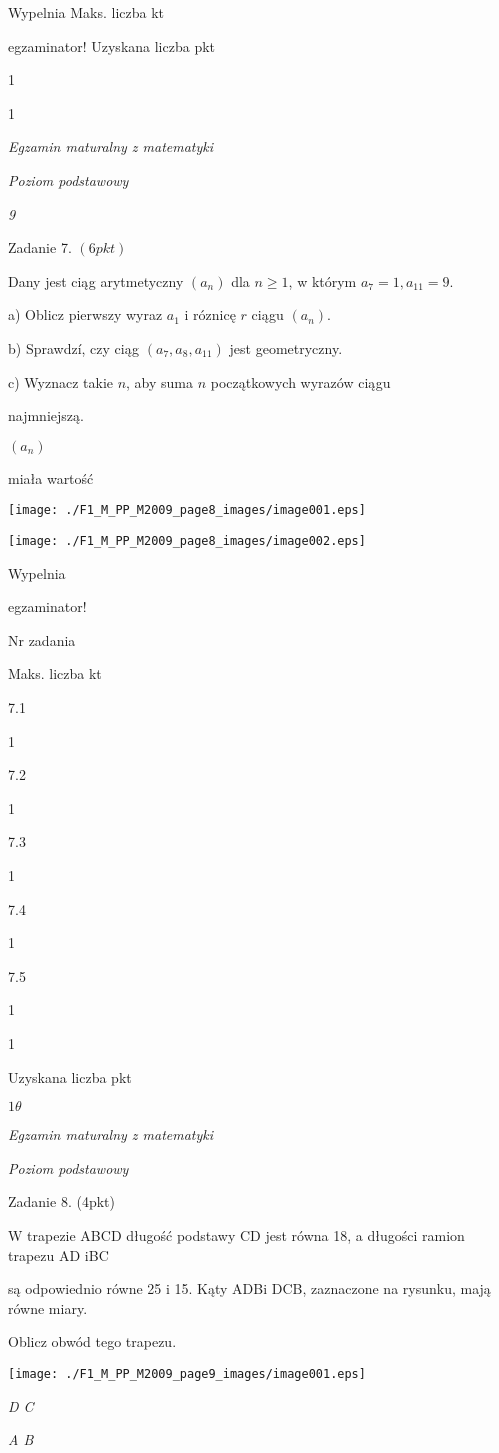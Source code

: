 \documentclass[a4paper,12pt]{article}
\begin{document}
Wypelnia Maks. liczba kt

egzaminator! Uzyskana liczba pkt

1

1





{\it Egzamin maturalny z matematyki}

{\it Poziom podstawowy}

{\it 9}

Zadanie 7. $(6pkt)$

Dany jest ciąg arytmetyczny $(a_{n})$ dla $n\geq 1$, w którym $a_{7}=1, a_{11}=9.$

a) Oblicz pierwszy wyraz $a_{1}$ i róznicę $r$ ciągu $(a_{n}).$

b) Sprawdzí, czy ciąg $(a_{7},a_{8},a_{11})$ jest geometryczny.

c) Wyznacz takie $n$, aby suma $n$ początkowych wyrazów ciągu

najmniejszą.

$(a_{n})$

miała wartość
\begin{center}
\texttt{[image: ./F1\_M\_PP\_M2009\_page8\_images/image001.eps]}

\texttt{[image: ./F1\_M\_PP\_M2009\_page8\_images/image002.eps]}
\end{center}
Wypelnia

egzaminator!

Nr zadania

Maks. liczba kt

7.1

1

7.2

1

7.3

1

7.4

1

7.5

1

1

Uzyskana liczba pkt





$ 1\theta$

{\it Egzamin maturalny z matematyki}

{\it Poziom podstawowy}

Zadanie 8. (4pkt)

W trapezie ABCD długość podstawy CD jest równa 18, a długości ramion trapezu AD iBC

są odpowiednio równe 25 i 15. Kąty ADBi DCB, zaznaczone na rysunku, mają równe miary.

Oblicz obwód tego trapezu.
\begin{center}
\texttt{[image: ./F1\_M\_PP\_M2009\_page9\_images/image001.eps]}
\end{center}
{\it D  C}

{\it A  B}
\end{document}

